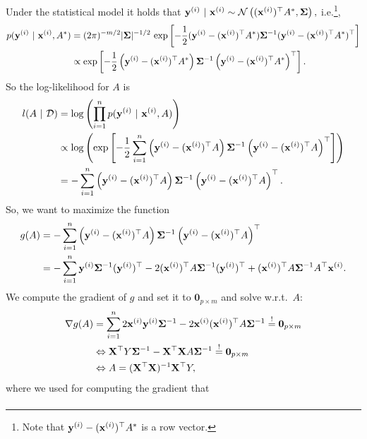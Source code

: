 \documentclass[a4paper]{article}
\begin{document}
{\begin{enumerate}
	Under the statistical model it holds that $\mathbf{y}^{(i)}~|~\mathbf{x}^{(i)} \sim \mathcal{N}\left(	(\mathbf{x}^{(i)})^\top A^*, \bm{\Sigma}	\right),$ i.e.\footnote{Note that $\mathbf{y}^{(i)} - (\mathbf{x}^{(i)})^\top A^* $ is a row vector.},
%	
	\begin{align}\label{def_distr}
%		
		p(\yv^{(i)}~|~\xi,A^*) 
%		
		&= (2\pi)^{-m/2} |\bm{\Sigma}|^{-1/2} \, \exp\left[	-\frac12 (\yv^{(i)} - (\xi)^\top A^* )	\bm{\Sigma}^{-1} (\yv^{(i)} - (\xi)^\top A^* )^\top	\right] \notag \\
%		
		&\propto \exp\left[	-\frac12 \left(\yv^{(i)} - (\xi)^\top A^* \right)	\bm{\Sigma}^{-1} \left(\yv^{(i)} - (\xi)^\top A^* \right)^\top	\right] .
%		
	\end{align}
%
	So the log-likelihood for $A$ is
%	
	\begin{align*}
%		
		l(A~|~\D) 
%		
		&= \log\left(	\prod_{i=1}^n 		p(\yv^{(i)}~|~\xi,A)	\right) \\
%		
		&\propto \log\left(	 	\exp\left[	-\frac12 \sum_{i=1}^n \left(\yv^{(i)} - (\xi)^\top A \right)	\bm{\Sigma}^{-1} \left(\yv^{(i)} - (\xi)^\top A \right)^\top	\right]	\right) \\
%		
		&= 	-\sum_{i=1}^n  \left(\yv^{(i)} - (\xi)^\top A \right)	\bm{\Sigma}^{-1} \left(\yv^{(i)} - (\xi)^\top A \right)^\top.		 
%		
	\end{align*}
%	
	So, we want to maximize the function 
%	
	\begin{align*}
%		
		g(A) 
%		
		&= 	-\sum_{i=1}^n  \left(\yv^{(i)} - (\xi)^\top A \right)	\bm{\Sigma}^{-1} \left(\yv^{(i)} - (\xi)^\top A \right)^\top \\
%		
		&= 	-\sum_{i=1}^n  \yv^{(i)} \bm{\Sigma}^{-1} (\yv^{(i)})^\top  
		- 2 (\xi)^\top A \bm{\Sigma}^{-1} (\yv^{(i)})^\top 
		+ (\xi)^\top A	\bm{\Sigma}^{-1}  A^\top \xi.	
%		
	\end{align*}
%	
	We compute the gradient of $g$ and set it to $\bm{0}_{p\times m}$ and solve w.r.t.\ $A:$
	\begin{align*}
		\nabla g(A) 
		&= 	\sum_{i=1}^n   2 \mathbf{x}^{(i)} \mathbf{y}^{(i)}   \bm{\Sigma}^{-1}
		- 2   \mathbf{x}^{(i)}	(\mathbf{x}^{(i)})^\top  A \bm{\Sigma}^{-1}   \stackrel{!}{=} \bm{0}_{p\times m} \\
		&\Leftrightarrow 	\mathbf{X}^\top Y  \bm{\Sigma}^{-1}
		-   \mathbf{X}^\top \mathbf{X}  A \bm{\Sigma}^{-1}   \stackrel{!}{=} \bm{0}_{p\times m} \\
		&\Leftrightarrow A = (\mathbf{X}^\top \mathbf{X})^{-1} \mathbf{X}^\top Y,
	\end{align*}
%
	where we used for computing the gradient that 
%	
	\begin{align*}

\end{align*}
\end{enumerate}}
\end{document}

